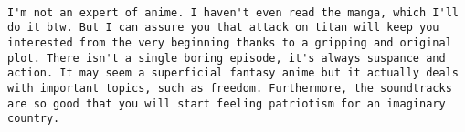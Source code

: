 \documentclass[
]{article}
\begin{document}
\begin{verbatim}
                                                                                                                                                                                                                                                                                                                                                                                                                                                                                                                                                                                                                                                                                                                                                                                                                                                                                                                                                                                                                                                                                                                                                                                                                                                                                                                                                                                                                                                                                                                                                                                                                                                                                                                                                                                                                                                                                                                                                                                                                                                                                                                                                                                                                                                                                                                                                                                                                                                                                                                                                                                                                                                                                                                                                      I'm not an expert of anime. I haven't even read the manga, which I'll do it btw. But I can assure you that attack on titan will keep you interested from the very beginning thanks to a gripping and original plot. There isn't a single boring episode, it's always suspance and action. It may seem a superficial fantasy anime but it actually deals with important topics, such as freedom. Furthermore, the soundtracks are so good that you will start feeling patriotism for an imaginary country.

\end{verbatim}
\end{document}
